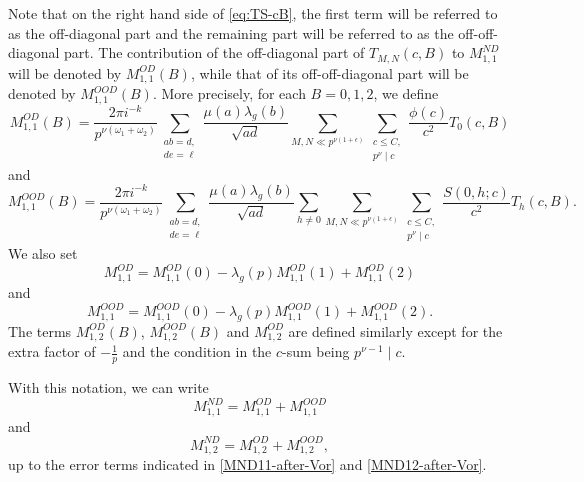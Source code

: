 \documentclass[12pt]{amsart}
\theoremstyle{plain}
\theoremstyle{definition}
\begin{document}
Note that on the right hand side of \eqref{eq:TS-cB}, the first term  will be referred to as the off-diagonal part and the remaining part will be referred to as the off-off-diagonal part. The contribution of the off-diagonal part of $T_{M,N}(c, B)$ to $M^{ND}_{1, 1}$ will be denoted by $M_{1, 1}^{OD}(B)$, while that of its off-off-diagonal part will be denoted by $M_{1, 1}^{OOD}(B)$. 
More precisely, 
for each $B=0, 1, 2$, we define
     \begin{equation}\label{eq:M 11 OD}
    M^{OD}_{1, 1}(B)
    =  \frac{2\pi i^{-k} }{p^{\nu(\omega_1+\omega_2)}}
    \sum_{\substack{ab=d, \\ de=\ell}} \frac{\mu(a) \lambda_g(b)}{\sqrt {ad}} 
    \sum_{ M, N \ll p^{\nu(1+\epsilon)}} \sum_{\substack{c\leq C, \\ p^\nu  \mid c}} \frac{\phi(c)}{c^2}
    T_0(c,B) 
     \end{equation}
     and  
  \begin{equation}\label{eq:M 11 OOD}
    M^{OOD}_{1, 1}(B)
    =  \frac{2\pi i^{-k} }{p^{\nu(\omega_1+\omega_2)}}
    \sum_{\substack{ab=d, \\ de=\ell}} \frac{\mu(a) \lambda_g(b)}{\sqrt {ad}} 
   \sum_{h\neq0}  
    \sum_{ M, N \ll p^{\nu(1+\epsilon)}}\sum_{\substack{c\leq C, \\ p^\nu  \mid c}} \frac{S(0, h ;c) 
    }{c^2}
     T_{h}(c, B).
     \end{equation}
     We also set
    \begin{equation}\label{eqn:M11OD}
    M^{OD}_{1, 1}
    = M^{OD}_{1, 1}(0)-\lambda_g(p) M^{OD}_{1, 1}(1)+M^{OD}_{1, 1}(2) 
    \end{equation}
    and 
    \begin{equation}\label{eqn:M11OOD}
    M^{OOD}_{1, 1}
    = M^{OOD}_{1, 1}(0)-\lambda_g(p) M^{OOD}_{1, 1}(1)+M^{OOD}_{1, 1}(2).
\end{equation}
The terms $M^{OD}_{1, 2}(B)$, $M^{OOD}_{1, 2}(B)$ and $M^{OD}_{1,2}$ are defined similarly except for the extra factor of $-\frac{1}{p}$ and the condition in the $c$-sum being $p^{\nu-1}\mid c$.

 With this notation, we can write
    \[
    M^{ND}_{1, 1}
    =M^{OD}_{1, 1}+M^{OOD}_{1, 1}\]     and
\[
    M^{ND}_{1, 2}
    =M^{OD}_{1, 2}+M^{OOD}_{1, 2},
    \]
    up to the error terms indicated in \eqref{MND11-after-Vor} and \eqref{MND12-after-Vor}.
    
\end{document}
